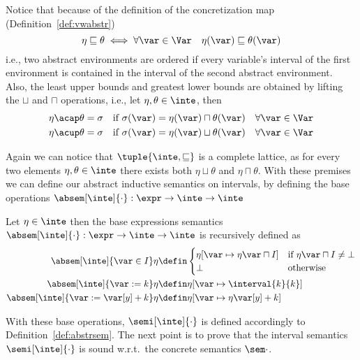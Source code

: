 Notice that because of the definition of the concretization map
(Definition~\ref{def:vwabstr})
\begin{equation*}
  \eta \sqsubseteq \theta \iff \forall \var \in \Var \quad \eta(\var) \sqsubseteq \theta(\var)
\end{equation*}
i.e., two abstract environments are ordered if every variable's
interval of the first environment is contained in the interval of the
second abstract environment.  Also, the least upper bounds and
greatest lower bounds are obtained by lifting the \(\sqcup\) and
\(\sqcap\) operations, i.e., let \(\eta, \theta \in \inte\), then
\begin{align*}
  \eta \acap \theta = \sigma & \quad \text{if } \sigma(\var) = \eta(\var) \sqcap \theta(\var) \quad \forall \var\in\Var \\
  \eta \acup \theta = \sigma & \quad \text{if } \sigma(\var) = \eta(\var) \sqcup \theta(\var) \quad \forall \var\in\Var
\end{align*}

Again we can notice that \(\tuple{\inte, \sqsubseteq}\) is a complete
lattice, as for every two elements \(\eta,\theta\in\inte\) there
exists both \(\eta \sqcup \theta\) and \(\eta \sqcap \theta\).  With
these premises we can define our abstract inductive semantics on
intervals, by defining the base operations
\(\absem[\inte]{\cdot} : \expr \to \inte \to \inte\)

\begin{definition}
  Let \(\eta \in \inte\) then the base expressions semantics
  \(\absem[\inte]{\cdot} : \expr \to \inte \to \inte\) is recursively
  defined as
  \begin{align*}
    \absem[\inte]{\var\in I}\eta & \defin
                                   \begin{cases}
                                     \eta[\var\mapsto\eta\var\sqcap I] & \text{if } \eta\var\sqcap I \neq \bot \\
                                     \bot & \text{otherwise}
                                   \end{cases} \\
    \absem[\inte]{\var := k}\eta & \defin \eta[\var\mapsto\interval{k}{k}] \\
    \absem[\inte]{\var := \var[y] + k}\eta & \defin \eta[\var\mapsto \eta\var[y] + k] \\
  \end{align*}
\end{definition}
With these base operations, \(\semi[\inte]{\cdot}\) is defined
accordingly to Definition~\ref{def:abstrsem}.  The next point is to
prove that the interval semantics \(\semi[\inte]{\cdot}\) is sound
w.r.t.\ the concrete semantics \(\sem\cdot\).

